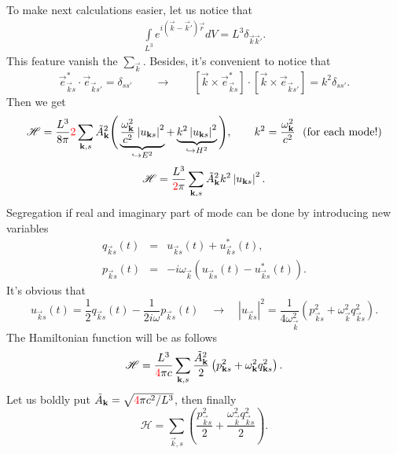 	To make next calculations easier, let us notice that
	\begin{eqnarray}
		\int \limits_{L^3} e^{i (\vec{k} - \vec{k}')\vec{r}} dV = L^3 \delta_{\vec{k}\vec{k}'}.
	\end{eqnarray}
	This feature vanish the $\sum_{\vec{k}}$. Besides, it's convenient to notice that
	\begin{equation}
		\vec{e}_{\vec{k}s}^* \cdot \vec{e}_{\vec{k}s'} = \delta_{ss'} \qquad \to \qquad
		\left[ \vec{k} \times \vec{e}_{\vec{k}s}^* \right] \cdot \left[ \vec{k} \times \vec{e}_{\vec{k}s'} \right] = k^2 \delta_{ss'}.
	\end{equation}
	Then we get
	\begin{equation}
		\mathscr{H} = \frac{L^3}{8 \pi}\textcolor{red}{2} \sum_{\vec{k},s} \tilde{A}_{\vec{k}}^2 \Bigg( \underbrace{\frac{\omega_{\vec{k}}^2}{c^2} \left| u_{\vec{k}s} \right|^2}_{\hookrightarrow E^2} + \underbrace{k^2 \left| u_{\vec{k}s} \right|^2}_{\hookrightarrow H^2}  \Bigg), \qquad k^2 = \frac{\omega_{\vec{k}}^2}{c^2} \text{\ \ (for each mode!)}
	\end{equation}
	\begin{equation}
		\mathscr{H} = \frac{L^3}{\textcolor{red}{2} \pi} \sum_{\vec{k},s} \tilde{A}_{\vec{k}}^2 k^2 \left| u_{\vec{k}s} \right|^2.
	\end{equation}
	Segregation if real and imaginary part of mode can be done by introducing new variables
	\begin{eqnarray}
		q_{\vec{k}s}(t) &=& u_{\vec{k}s}(t) + u^*_{\vec{k}s}(t) , \\
		p_{\vec{k}s}(t) &=& -i \omega_{\vec{k}}  \left( u_{\vec{k}s}(t) - u^*_{\vec{k}s}(t) \right).
	\end{eqnarray}
	It's obvious that
	\begin{equation}
		u_{\vec{k}s}(t) = \frac{1}{2} q_{\vec{k}s}(t) - \frac{1}{2 i \omega} p_{\vec{k}s}(t) \quad \to \quad \left| u_{\vec{k}s} \right|^2 = \frac{1}{4 \omega_{\vec{k}}^2} \left( p^2_{\vec{k}s} + \omega^2_{\vec{k}} q_{\vec{k}s}^2 \right).
	\end{equation}
	The Hamiltonian function will be as follows
	\begin{equation}
		\mathscr{H} = \frac{L^3}{\textcolor{red}{4} \pi c} \sum_{\vec{k},s} \frac{\tilde{A}_{\vec{k}}^2}{2} \left( p^2_{\vec{k}s} + \omega^2_{\vec{k}} q_{\vec{k}s}^2 \right).
	\end{equation}
	Let us boldly put $\tilde{A}_{\vec{k}} = \sqrt{\textcolor{red}{4} \pi c^2/L^3}$, then finally
	\begin{equation}
		\mathscr{H} = \sum_{\vec{k},s}  \left( \frac{p^2_{\vec{k}s}}{2}+ \frac{\omega^2_{\vec{k}} q_{\vec{k}s}^2}{2} \right).
	\end{equation}
	
